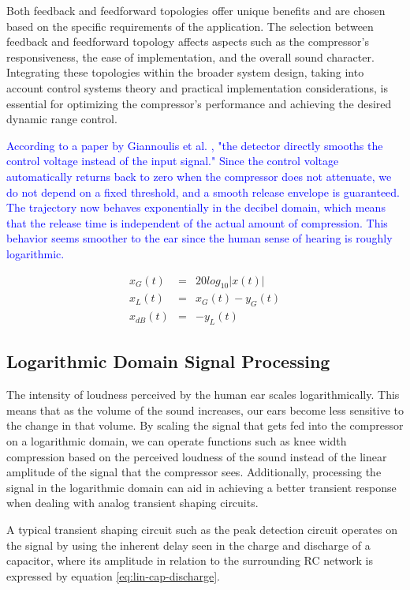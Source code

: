 \documentclass[10pt]{article}
\begin{document}
\begin{multicols*}{2}
                Both feedback and feedforward topologies offer unique benefits and are chosen based on the specific requirements of the application. The selection between feedback and feedforward topology affects aspects such as the compressor's responsiveness, the ease of implementation, and the overall sound character. Integrating these topologies within the broader system design, taking into account control systems theory and practical implementation considerations, is essential for optimizing the compressor's performance and achieving the desired dynamic range control.\par
                \textcolor{blue}{According to a paper by Giannoulis et al. \cite{drc-tutorial}, "the detector directly smooths the control voltage instead of the input signal." Since the control voltage automatically returns back to zero when the compressor does not attenuate, we do not depend on a fixed threshold, and a smooth release envelope is guaranteed. The trajectory now behaves exponentially in the decibel domain, which means that the release time is independent of the actual amount of compression. This behavior seems smoother to the ear since the human sense of hearing is roughly logarithmic.} 

                    \begin{eqnarray}
                        x_G(t)&=&20log_{10}|x(t)|\\
                        x_L(t)&=&x_G(t)-y_G(t)\\
                        x_{dB}(t)&=&-y_L(t)
                    \end{eqnarray}
    
            \subsection{Logarithmic Domain Signal Processing}
                The intensity of loudness perceived by the human ear scales logarithmically. This means that as the volume of the sound increases, our ears become less sensitive to the change in that volume. By scaling the signal that gets fed into the compressor on a logarithmic domain, we can operate functions such as knee width compression based on the perceived loudness of the sound instead of the linear amplitude of the signal that the compressor sees. Additionally, processing the signal in the logarithmic domain can aid in achieving a better transient response when dealing with analog transient shaping circuits.\par
                A typical transient shaping circuit such as the peak detection circuit operates on the signal by using the inherent delay seen in the charge and discharge of a capacitor, where its amplitude in relation to the surrounding RC network is expressed by equation \ref{eq:lin-cap-discharge}.
                

\end{multicols*}
\end{document}
